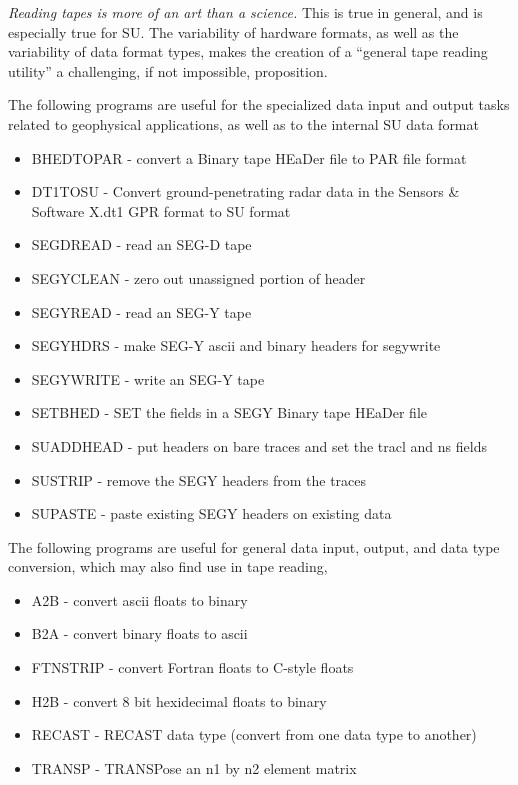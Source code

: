 {{{{\em Reading tapes is more of an art than a science.\/} This is
true in general, and is especially true for SU.
The variability of hardware formats, as well as the variability
of data format types, makes the creation of a ``general tape
reading utility'' a challenging, if not impossible, proposition.

The following programs are useful for the specialized data input and output
tasks related to geophysical applications, as well as to the internal
SU data format
\begin{itemize}
\item BHEDTOPAR - convert a Binary tape HEaDer file to PAR file format
\item DT1TOSU - Convert ground-penetrating radar data in the 
Sensors \& Software X.dt1 GPR format to SU format
\item SEGDREAD - read an SEG-D tape 
\item SEGYCLEAN - zero out unassigned portion of header
\item SEGYREAD - read an SEG-Y tape 
\item SEGYHDRS - make SEG-Y ascii and binary headers for segywrite
\item SEGYWRITE - write an SEG-Y tape 
\item SETBHED - SET the fields in a SEGY Binary tape HEaDer file
\item SUADDHEAD - put headers on bare traces and set the tracl and ns fields 
\item SUSTRIP - remove the SEGY headers from the traces 
\item SUPASTE - paste existing SEGY headers on existing data
\end{itemize}

The following programs are useful for general data input, output,
and data type conversion, which may also find use in tape reading,

\begin{itemize}
\item A2B - convert ascii floats to binary
\item B2A - convert binary floats to ascii
\item FTNSTRIP - convert Fortran floats to C-style floats 
\item H2B - convert 8 bit hexidecimal floats to binary
\item RECAST - RECAST data type (convert from one data type to another)
\item TRANSP - TRANSPose an n1 by n2 element matrix 
\end{itemize}

}}}
